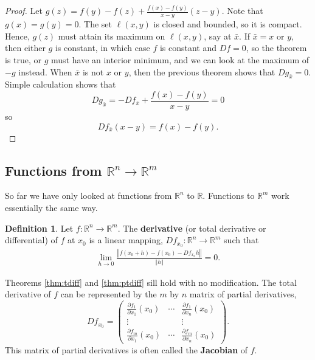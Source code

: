 \documentclass[12pt,reqno]{amsart}
\theoremstyle{definition}
\newtheorem{definition}{Definition}[section]
\def\R{\mathbb{R}}
\newcommand{\norm}[1]{\left\Vert {#1} \right\Vert}
\renewcommand{\to}{{\rightarrow}}
\begin{document}
\begin{proof}
  Let $g(z) = f(y)  - f(z) + \frac{f(x) - f(y)}{x-y} (z - y)$. Note
  that $g(x) = g(y) = 0$. The set $\ell(x,y)$ is closed and bounded, so
  it is compact. Hence, $g(z)$ must attain its maximum on
  $\ell(x,y)$, say at $\bar{x}$. If $\bar{x} = x$ or $y$, then either
  $g$ is constant, in which case $f$ is constant and $Df = 0$, so the
  theorem is true, or $g$ must have an interior minimum, and we can
  look at the maximum of $-g$ instead. When $\bar{x}$ is not $x$ or
  $y$, then the previous theorem shows that $Dg_{\bar{x}} = 0$. Simple
  calculation shows that
  \[ Dg_{\bar{x}} = -Df_{\bar{x}} +  \frac{f(x) - f(y)}{x-y} = 0 \]
  so 
  \[ Df_{\bar{x}}(x-y) = f(x) - f(y). \]
\end{proof}

\subsection{Functions from $\R^n \to \R^m$}

So far we have only looked at functions from $\R^n$ to $\R$. Functions
to $\R^m$ work essentially the same way. 
\begin{definition}
  Let $f: \R^n \to \R^m$. The \textbf{derivative} (or total derivative
  or differential) of $f$ at $x_0$ is a linear mapping, $Df_{x_0}:
  \R^n \to \R^m$ such that
  \begin{align*}
    \lim_{h \to 0} \frac{\left\Vert f(x_0 + h) - f(x_0) - Df_{x_0}
        h\right\Vert} {\norm{h}} = 0. 
  \end{align*}
\end{definition}
Theorems \ref{thm:tdiff} and \ref{thm:ptdiff} sill hold with no
modification. The total derivative of $f$ can be represented by the
$m$ by $n$ matrix of partial derivatives,
\[ Df_{x_0}  = \begin{pmatrix} \frac{\partial f_1}{\partial x_1}(x_0) &
  \cdots & \frac{\partial f_1}{\partial x_n}(x_0) \\
  \vdots & & \vdots \\
  \frac{\partial f_m}{\partial x_1}(x_0) & \cdots & \frac{\partial
    f_m}{\partial x_n}(x_0)  
\end{pmatrix}. \] 
This matrix of partial derivatives is often called
the \textbf{Jacobian} of $f$. 
\end{document}
